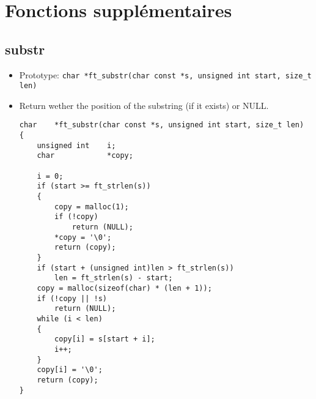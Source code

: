 \documentclass{article}
\begin{document}
\section{Fonctions supplémentaires}
	
	\subsection{substr}
		\begin{itemize}[label=$\rightarrow$]
			\item Prototype: \texttt{char    *ft\_substr(char const *s, unsigned int start, size\_t len)}
			\item Return wether the position of the substring (if it exists) or NULL.
			\begin{verbatim}
char    *ft_substr(char const *s, unsigned int start, size_t len)               
{                                                                               
    unsigned int    i;                                                          
    char            *copy;                                                      
                                                                                
    i = 0;                                                                      
    if (start >= ft_strlen(s))                                                  
    {                                                                           
        copy = malloc(1);                                                       
        if (!copy)                                                              
            return (NULL);                                                      
        *copy = '\0';                                                           
        return (copy);                                                          
    }                                                                           
    if (start + (unsigned int)len > ft_strlen(s))                               
        len = ft_strlen(s) - start;                                             
    copy = malloc(sizeof(char) * (len + 1));                                    
    if (!copy || !s)                                                            
        return (NULL);                                                          
    while (i < len)                                                             
    {                                                                           
        copy[i] = s[start + i];                                                 
        i++;                                                                    
    }                                                                           
    copy[i] = '\0';                                                             
    return (copy);                                                              
}
			\end{verbatim}
		\end{itemize}
	
\end{document}

